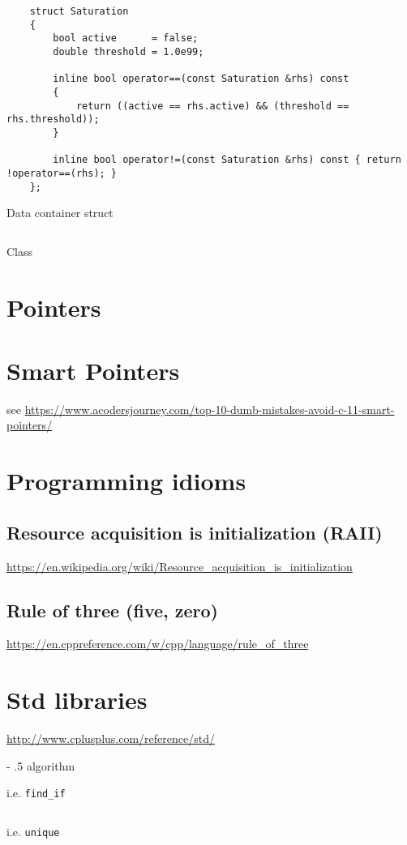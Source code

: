 \documentclass[
10pt,
a4paper,
parskip=half,	%
DIV=0,			%
BCOR=10mm
]{scrartcl}
\makeatletter
\renewcommand\paragraph{%
	\@startsection{paragraph}{4}{0mm}%
	{-\baselineskip}%
	{.5\baselineskip}%
	{\normalfont\normalsize\bfseries}}
\newcommand{\ttt}[1]{\texttt{#1}}
\makeatother
\begin{document}
\begin{listing}[htbp]
	\begin{verbatim}
	struct Saturation
	{
		bool active      = false;
		double threshold = 1.0e99;
		
		inline bool operator==(const Saturation &rhs) const
		{
			return ((active == rhs.active) && (threshold == rhs.threshold));
		}
		
		inline bool operator!=(const Saturation &rhs) const { return !operator==(rhs); }
	};
	\end{verbatim}
	\caption{Data container struct}
\end{listing}

\begin{listing}[htbp]
	\inputminted{cpp}{src/classes-structs/ReceiverPath.h}
	\caption{Class}
\end{listing}
	
\pagebreak
\section{Pointers}

	
\section{Smart Pointers}
    see \url{https://www.acodersjourney.com/top-10-dumb-mistakes-avoid-c-11-smart-pointers/}	
\section{Programming idioms} 
\label{sec:programming-idioms}
	\subsection{Resource acquisition is initialization (RAII)}
	
	\url{https://en.wikipedia.org/wiki/Resource_acquisition_is_initialization}
	
	\subsection{Rule of three (five, zero)}
	\label{subsec:rule-of-three}
	
	\url{https://en.cppreference.com/w/cpp/language/rule_of_three}
	

\section{Std libraries}
	
	\url{http://www.cplusplus.com/reference/std/}
	
	\paragraph{algorithm}
	
	i.e. \ttt{find\_if}
	\inputminted{cpp}{src/algorithm/ex-1/main.cpp}
	
	i.e. \ttt{unique}
	\inputminted{cpp}{src/algorithm/ex-2/main.cpp}
	
\end{document}
